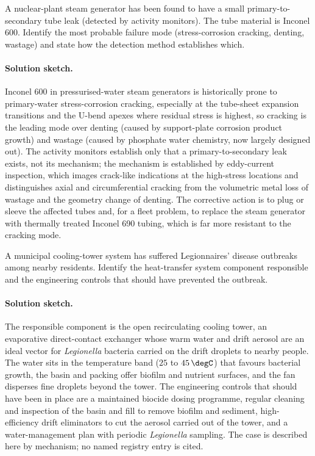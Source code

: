 \begin{exercise}
A nuclear-plant steam generator has been found to have a small
primary-to-secondary tube leak (detected by activity monitors). The
tube material is Inconel 600. Identify the most probable failure
mode (stress-corrosion cracking, denting, wastage) and state how the
detection method establishes which.

\paragraph{Solution sketch.} Inconel 600 in pressurised-water steam
generators is historically prone to primary-water stress-corrosion
cracking, especially at the tube-sheet expansion transitions and the
U-bend apexes where residual stress is highest, so cracking is the
leading mode over denting (caused by support-plate corrosion product
growth) and wastage (caused by phosphate water chemistry, now largely
designed out). The activity monitors establish only that a
primary-to-secondary leak exists, not its mechanism; the mechanism is
established by eddy-current inspection, which images crack-like
indications at the high-stress locations and distinguishes axial and
circumferential cracking from the volumetric metal loss of wastage and
the geometry change of denting. The corrective action is to plug or
sleeve the affected tubes and, for a fleet problem, to replace the
steam generator with thermally treated Inconel 690 tubing, which is far
more resistant to the cracking mode.
\end{exercise}

\begin{exercise}
A municipal cooling-tower system has suffered Legionnaires' disease
outbreaks among nearby residents. Identify the heat-transfer system
component responsible and the engineering controls that should have
prevented the outbreak.

\paragraph{Solution sketch.} The responsible component is the open
recirculating cooling tower, an evaporative direct-contact exchanger
whose warm water and drift aerosol are an ideal vector for
\emph{Legionella} bacteria carried on the drift droplets to nearby
people. The water sits in the temperature band ($25$ to $45\,\degC$)
that favours bacterial growth, the basin and packing offer biofilm and
nutrient surfaces, and the fan disperses fine droplets beyond the
tower. The engineering controls that should have been in place are a
maintained biocide dosing programme, regular cleaning and inspection of
the basin and fill to remove biofilm and sediment, high-efficiency
drift eliminators to cut the aerosol carried out of the tower, and a
water-management plan with periodic \emph{Legionella} sampling. The
case is described here by mechanism; no named registry entry is cited.
\end{exercise}

